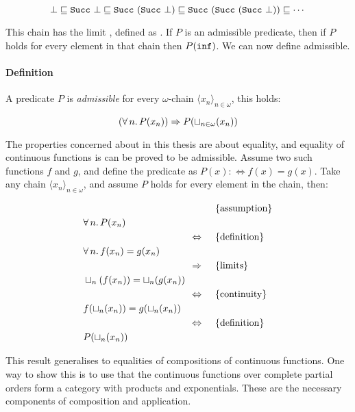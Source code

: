 \begin{equation*}
\bot \sqsubseteq
\texttt{Succ} \,\, \bot \sqsubseteq
\texttt{Succ} \,\, (\texttt{Succ} \,\, \bot) \sqsubseteq
\texttt{Succ} \,\, (\texttt{Succ} \,\, (\texttt{Succ} \,\, \bot)) \sqsubseteq
\cdots
\end{equation*}

This chain has the limit , defined as . If
$P$ is an admissible predicate, then if $P$ holds for every element in
that chain then $P(\texttt{inf})$. We can now define admissible.

\paragraph{Definition} A predicate $P$ is \emph{admissible} for every
$\omega$-chain $\langle x_n \rangle_{n \in \omega}$, this holds:

\begin{equation*}
(\forall \, n . \, P(x_n)) \Rightarrow P(\sqcup_{n \in \omega}(x_n))
\end{equation*}

The properties concerned about in this thesis are about equality, and
equality of continuous functions is can be proved to be
admissible. Assume two such functions $f$ and $g$, and define the
predicate as $P(x) :\Leftrightarrow f(x) = g(x)$. Take any chain
$\langle x_n \rangle_{n \in \omega}$, and assume $P$ holds for every
element in the chain, then:

\begin{align*}
\desca{assumption}               \\
& \fa{n} P(x_n)                    \\
\desclra{definition}             \\
& \fa{n} f(x_n) = g(x_n)           \\
\descra{limits}                  \\
& \lub{n}(f(x_n)) = \lub{n}(g(x_n))  \\
\desclra{continuity}             \\
& f(\lub{n}(x_n)) = g(\lub{n}(x_n))  \\
\desclra{definition}             \\
& P(\lub{n}(x_n))
\end{align*}

This result generalises to equalities of compositions of continuous
functions. One way to show this is to use that the continuous
functions over complete partial orders form a category with products
and exponentials. These are the necessary components of composition
and application.

